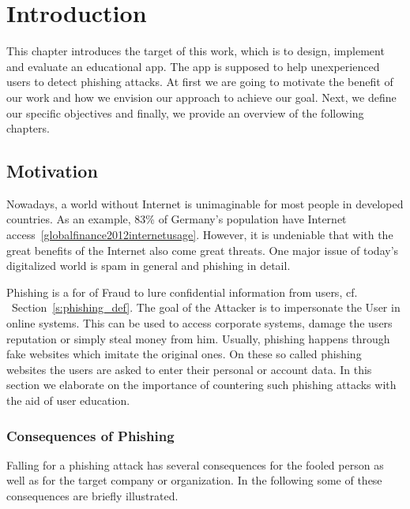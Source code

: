 \section{Introduction}
\label{s:introduction}
This chapter introduces the target of this work, which is to design, implement and evaluate an educational app.
 The app is supposed to help unexperienced users to detect phishing attacks.
 At first we are going to motivate the benefit of our work and how we envision our approach to achieve our goal.
 Next, we define our specific objectives and finally, we provide an overview of the following chapters.


\subsection{Motivation}
Nowadays, a world without Internet is unimaginable for most people in developed countries.
As an example, 83\% of Germany's population have Internet access~\ref{globalfinance2012internetusage}. 
However, it is undeniable that with the great benefits of the Internet also come great threats. 
One major issue of today's digitalized world is spam in general and phishing in detail. 

Phishing is a for of Fraud to lure confidential information from users, cf.
~Section~\ref{s:phishing_def}. The goal of the Attacker is to impersonate the User in online systems.
 This can be used to access corporate systems, damage the users reputation or simply steal money from him.
 Usually, phishing happens through fake websites which imitate the original ones.
 On these so called phishing websites the users are asked to enter their personal or account data.
 In this section we elaborate on the importance of countering such phishing attacks with the aid of user education. 



\subsubsection{Consequences of Phishing}
Falling for a phishing attack has several consequences for the fooled person as well as for the target company or organization.
 In the following some of these consequences are briefly illustrated.

